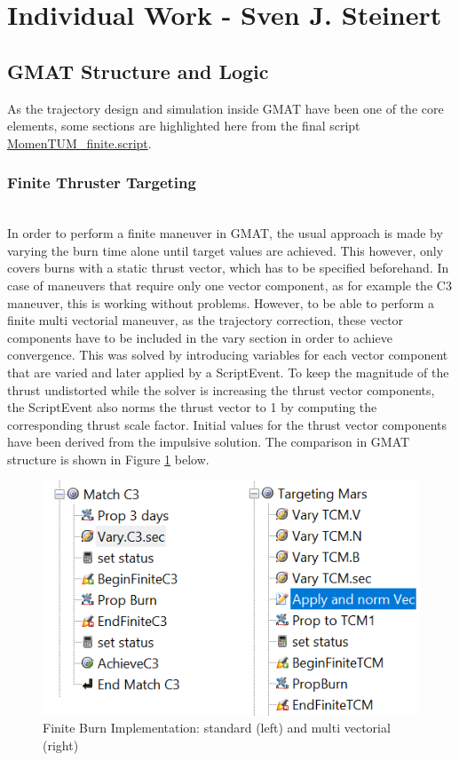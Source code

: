 \section{Individual Work - Sven J. Steinert}

\subsection{GMAT Structure and Logic}
As the trajectory design and simulation inside GMAT have been one of the core elements, some sections are highlighted here from the final script \href{https://github.com/Sven-J-Steinert/MomenTUM/blob/main/GMAT/MomenTUM_finite.script}{\colorbox{codegray}{MomenTUM\_finite.script}}.
\\

\subsubsection{Finite Thruster Targeting}
\
\\
In order to perform a finite maneuver in GMAT, the usual approach is made by varying the burn time alone until target values are achieved.
This however, only covers burns with a static thrust vector, which has to be specified beforehand.
In case of maneuvers that require only one vector component, as for example the C3 maneuver, this is working without problems.
However, to be able to perform a finite multi vectorial maneuver, as the trajectory correction, these vector components have to be included in the vary section in order to achieve convergence.
This was solved by introducing variables for each vector component that are varied and later applied by a ScriptEvent.
To keep the magnitude of the thrust undistorted while the solver is increasing the thrust vector components, the ScriptEvent also norms the thrust vector to 1 by computing the corresponding thrust scale factor. Initial values for the thrust vector components have been derived from the impulsive solution. The comparison in GMAT structure is shown in Figure \ref{fig:gmat-finite} below.

\begin{figure}[H]
  \centering
  \includegraphics[width=0.7\linewidth]{img/gmat_finite.png}
  \caption{Finite Burn Implementation: standard (left) and multi vectorial (right)}
  \label{fig:gmat-finite}
\end{figure}

